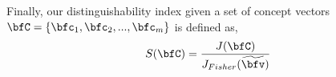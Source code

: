 Finally, our distinguishability index given a set of concept vectors $\bfC = \{\bfc_1, \bfc_2, ..., \bfc_m\}$ is defined as,
\begin{equation}
    \label{equ: distinguishability}
    S(\bfC) = \frac{J(\bfC)}{J_{Fisher}(\widetilde{\bfv})}
\end{equation}
    
    
    


